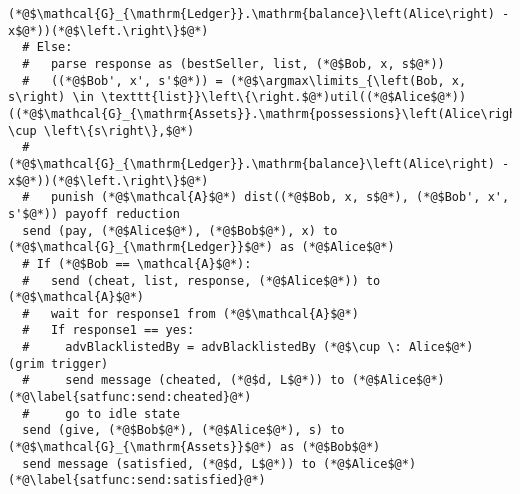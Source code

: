 \begin{lstlisting}[label=satfunc, style=numbers]
        (*@$\mathcal{G}_{\mathrm{Ledger}}.\mathrm{balance}\left(Alice\right) - x$@*))(*@$\left.\right\}$@*)
  # Else:
  #   parse response as (bestSeller, list, (*@$Bob, x, s$@*))
  #   ((*@$Bob', x', s'$@*)) = (*@$\argmax\limits_{\left(Bob, x, s\right) \in \texttt{list}}\left\{\right.$@*)util((*@$Alice$@*))((*@$\mathcal{G}_{\mathrm{Assets}}.\mathrm{possessions}\left(Alice\right) \cup \left\{s\right\},$@*)
  #      (*@$\mathcal{G}_{\mathrm{Ledger}}.\mathrm{balance}\left(Alice\right) - x$@*))(*@$\left.\right\}$@*)
  #   punish (*@$\mathcal{A}$@*) dist((*@$Bob, x, s$@*), (*@$Bob', x', s'$@*)) payoff reduction
  send (pay, (*@$Alice$@*), (*@$Bob$@*), x) to (*@$\mathcal{G}_{\mathrm{Ledger}}$@*) as (*@$Alice$@*)
  # If (*@$Bob == \mathcal{A}$@*):
  #   send (cheat, list, response, (*@$Alice$@*)) to (*@$\mathcal{A}$@*)
  #   wait for response1 from (*@$\mathcal{A}$@*)
  #   If response1 == yes:
  #     advBlacklistedBy = advBlacklistedBy (*@$\cup \: Alice$@*) (grim trigger)
  #     send message (cheated, (*@$d, L$@*)) to (*@$Alice$@*) (*@\label{satfunc:send:cheated}@*)
  #     go to idle state
  send (give, (*@$Bob$@*), (*@$Alice$@*), s) to (*@$\mathcal{G}_{\mathrm{Assets}}$@*) as (*@$Bob$@*)
  send message (satisfied, (*@$d, L$@*)) to (*@$Alice$@*) (*@\label{satfunc:send:satisfied}@*)
\end{lstlisting}
